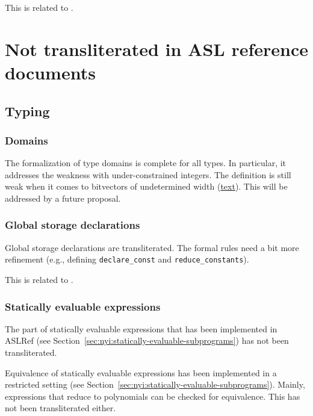 \documentclass{book}
\begin{document}
This is related to .


\chapter{Not transliterated in ASL reference documents}

\section{Typing}

\subsection{Domains}

The formalization of type domains is complete for all types.
In particular, it addresses the weakness with under-constrained integers.
The definition is still weak when it comes to bitvectors of undetermined width (\url{text}).
This will be addressed by a future proposal.

\subsection{Global storage declarations}

Global storage declarations are transliterated.
The formal rules need a bit more refinement (e.g., defining \texttt{declare\_const} and \texttt{reduce\_constants}).

This is related to .

\subsection{Statically evaluable expressions}

The part of statically evaluable expressions that has been implemented in
ASLRef (see Section~\ref{sec:nyi:statically-evaluable-subprograms}) has not
been transliterated.

Equivalence of statically evaluable expressions has been implemented in a
restricted setting (see
Section~\ref{sec:nyi:statically-evaluable-subprograms}).
%
Mainly, expressions that reduce to polynomials can be checked for equivalence.
%
This has not been transliterated either.
\end{document}
